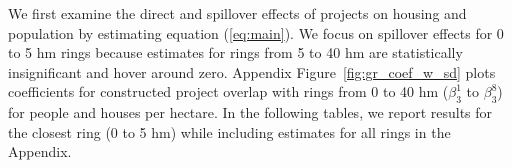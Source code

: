 \documentclass[12pt]{article}
\begin{document}




We first examine the direct and spillover effects of projects on housing and population by estimating equation (\ref{eq:main}).  We focus on spillover effects for 0 to 5 hm rings because estimates for rings from 5 to 40 hm  are statistically insignificant and hover around zero.  Appendix Figure~\ref{fig:gr_coef_w_sd} plots coefficients for constructed project overlap with rings from 0 to 40 hm ($\beta_3^{1}$ to $\beta_3^{8}$) for people and houses per hectare.  In the following tables, we report results for the closest ring (0 to 5 hm) while including estimates for all rings in the Appendix.
\end{document}
